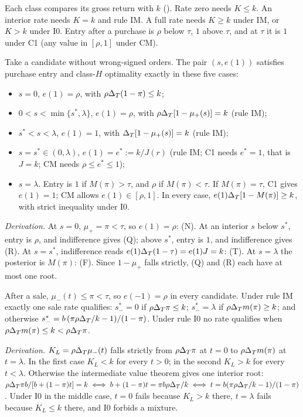 Each class compares its gross return with \(k\) ().
Rate zero needs \(K\le k\).
An interior rate needs \(K=k\) and rule IM.
A full rate needs \(K\ge k\) under IM, or \(K>k\) under I0. Entry after a purchase is \(\rho\) below \(\tau\), \(1\) above \(\tau\), and at \(\tau\) it is \(1\)
under C1 (any value in \([\rho,1]\) under CM).

\begin{resultbox}
Take a candidate without wrong-signed orders.
The pair \((s,e(1))\) satisfies purchase entry and class-\(H\) optimality exactly in these five cases:
\begin{itemize}[leftmargin=1.5em]
\item[(N)] \(s=0\), \(e(1)=\rho\), with \(\rho\Delta_T(1-\pi)\le k\);
\item[(Q)] \(0<s<\min\{s^*,\lambda\}\), \(e(1)=\rho\), with \(\rho\Delta_T[1-\mu_+(s)]=k\) (rule IM);
\item[(R)] \(s^*<s<\lambda\), \(e(1)=1\), with \(\Delta_T[1-\mu_+(s)]=k\) (rule IM);
\item[(T)] \(s=s^*\in(0,\lambda)\), \(e(1)=e^*:=k/J(r)\) (rule IM; C1 needs \(e^*=1\), that is \(J=k\); CM needs
\(\rho\le e^*\le1\));
\item[(F)] \(s=\lambda\).
Entry is \(1\) if \(M(\pi)>\tau\), and \(\rho\) if \(M(\pi)<\tau\).
If \(M(\pi)=\tau\), C1 gives \(e(1)=1\); CM allows \(e(1)\in[\rho,1]\).
In every case, \(e(1)\Delta_T[1-M(\pi)]\ge k\), with strict inequality under I0.
\end{itemize}
\end{resultbox}
\emph{Derivation.} At \(s=0\), \(\mu_+=\pi<\tau\), so \(e(1)=\rho\): (N). At an interior \(s\) below \(s^*\), entry is
\(\rho\), and indifference gives (Q); above \(s^*\), entry is \(1\), and indifference gives (R). At \(s=s^*\),
indifference reads \(e(1)\Delta_T(1-\tau)=e(1)J=k\): (T). At \(s=\lambda\) the posterior is \(M(\pi)\): (F). Since \(1-\mu_+\)
falls strictly, (Q) and (R) each have at most one root.

\begin{resultbox}
After a sale, \(\mu_-(t)\le\pi<\tau\), so \(e(-1)=\rho\) in every candidate. Under rule IM exactly one sale rate qualifies:
\(s_-^*=0\) if \(\rho\Delta_T\pi\le k\); \(s_-^*=\lambda\) if \(\rho\Delta_T m(\pi)\ge k\); and otherwise
\(s_-^*=b\,(\pi\rho\Delta_T/k-1)/(1-\pi)\). Under rule I0 no rate qualifies when \(\rho\Delta_T m(\pi)\le k<\rho\Delta_T\pi\).
\end{resultbox}
\emph{Derivation.} \(K_L=\rho\Delta_T\mu_-(t)\) falls strictly from \(\rho\Delta_T\pi\) at \(t=0\) to \(\rho\Delta_T m(\pi)\) at
\(t=\lambda\). In the first case \(K_L<k\) for every \(t>0\); in the second \(K_L>k\) for every \(t<\lambda\). Otherwise
the intermediate value theorem gives one interior root:
\(\rho\Delta_T\pi b/[b+(1-\pi)t]=k\iff b+(1-\pi)t=\pi b\rho\Delta_T/k\iff t=b(\pi\rho\Delta_T/k-1)/(1-\pi)\). Under I0 in the middle
case, \(t=0\) fails because \(K_L>k\) there, \(t=\lambda\) fails because \(K_L\le k\) there, and I0 forbids a mixture.

